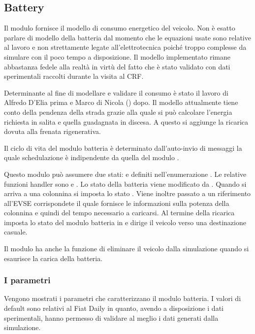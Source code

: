 \subsection{Battery}\label{sec:battery}

Il modulo  fornisce il modello di consumo energetico del veicolo. Non è esatto parlare di modello della batteria dal momento che le equazioni usate sono relative al lavoro e non strettamente legate all'elettrotecnica poiché troppo complesse da simulare con il poco tempo a disposizione. Il modello implementato rimane abbastanza fedele alla realtà in virtù del fatto che è stato validato con dati sperimentali raccolti durante la visita al CRF.

Determinante al fine di modellare e validare il consumo è stato il lavoro di Alfredo D'Elia prima e Marco di Nicola (\cite{dinicola2014}) dopo. Il modello attualmente tiene conto della pendenza della strada grazie alla quale si può calcolare l'energia richiesta in salita e quella guadagnata in discesa. A questo si aggiunge la ricarica dovuta alla frenata rigenerativa.

Il ciclo di vita del modulo batteria è determinato dall'auto-invio di messaggi la quale schedulazione è indipendente da quella del modulo .

Questo modulo può assumere due stati:  e  definiti nell'enumerazione . Le relative funzioni handler sono  e . Lo stato della batteria viene modificato da . Quando si arriva a una colonnina si imposta lo stato . Viene inoltre passato a  un riferimento all'EVSE corrispondete il quale fornisce le informazioni sulla potenza della colonnina e quindi del tempo necessario a caricarsi. Al termine della ricarica  imposta lo stato del modulo batteria in  e dirige il veicolo verso una destinazione casuale.

Il modulo  ha anche la funzione di eliminare il veicolo dalla simulazione quando si esaurisce la carica della batteria.

\subsubsection{I parametri}

Vengono mostrati i parametri che caratterizzano il modulo batteria. I valori di default sono relativi al Fiat Daily in quanto, avendo a disposizione i dati sperimentali, hanno permesso di validare al meglio i dati generati dalla simulazione.

